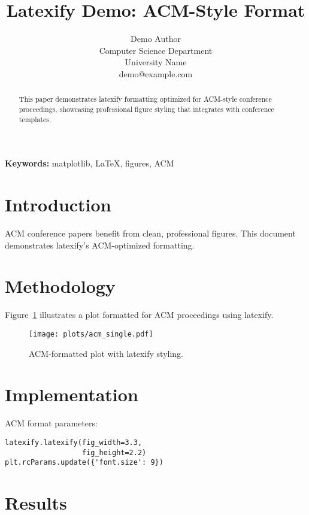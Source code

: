 \documentclass[10pt,twocolumn]{article}
\begin{document}
\title{\textbf{Latexify Demo: ACM-Style Format}}

\author{Demo Author \\
Computer Science Department \\
University Name \\
demo@example.com}

\date{}
\maketitle

\begin{abstract}
This paper demonstrates latexify formatting optimized for ACM-style conference proceedings, showcasing professional figure styling that integrates with conference templates.
\end{abstract}

\textbf{Keywords:} matplotlib, LaTeX, figures, ACM

\section{Introduction}

ACM conference papers benefit from clean, professional figures. This document demonstrates latexify's ACM-optimized formatting.

\section{Methodology}

Figure~\ref{fig:acm_plot} illustrates a plot formatted for ACM proceedings using latexify.

\begin{figure}[htbp]
  \centering
  \texttt{[image: plots/acm\_single.pdf]}
  \caption{ACM-formatted plot with latexify styling.}
  \label{fig:acm_plot}
\end{figure}

\section{Implementation}

ACM format parameters:

\begin{verbatim}
latexify.latexify(fig_width=3.3, 
                  fig_height=2.2)
plt.rcParams.update({'font.size': 9})
\end{verbatim}

\section{Results}
\end{document}

